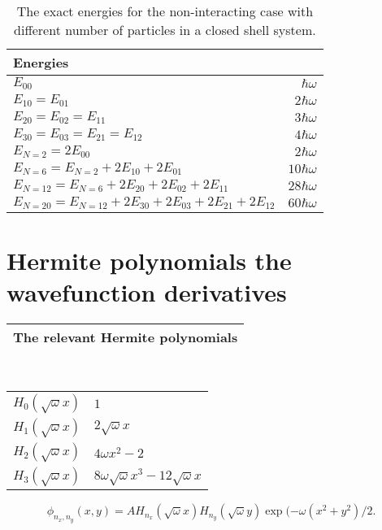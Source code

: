 \begin{table}[H]\caption{The exact energies for the non-interacting case with different number of particles in a closed shell system.}\label{tab:exact_energies_non_interacting}
\center
\begin{tabular}{l|r}
Energies & \\ \hline
$E_{00}$ & $ \hbar \omega$ \\
$E_{10} = E_{01}$ & $2 \hbar \omega$\\
$E_{20} = E_{02} = E_{11}$ & $3 \hbar \omega$\\
$E_{30} = E_{03} = E_{21}= E_{12}$ & $4 \hbar \omega$\\ \hline
$E_{N=2} = 2E_{00}$ & $2 \hbar \omega$\\
$E_{N=6} = E_{N=2} + 2E_{10} + 2E_{01}$ &$ 10 \hbar \omega$\\
$E_{N=12} = E_{N=6} + 2E_{20} +2 E_{02} + 2E_{11}$ &$ 28 \hbar \omega$\\
$E_{N=20} = E_{N=12} + 2E_{30} + 2E_{03} + 2E_{21}+ 2E_{12}$ &$ 60 \hbar \omega$\\
\end{tabular}
\end{table}

\section{Hermite polynomials the wavefunction derivatives}

\begin{table}[H]
\center
\begin{tabular}{l}
The relevant Hermite polynomials \\ \hline
\end{tabular}\\
\begin{tabular}{l|l}
$H_0(\sqrt{\omega}x)$ & $1$ \\
$H_1(\sqrt{\omega}x)$ & $2\sqrt{\omega}x$ \\
$H_2(\sqrt{\omega}x)$ & $4\omega x^2 -2 $ \\
$H_3(\sqrt{\omega}x)$ & $8\omega\sqrt{\omega}x^3 - 12\sqrt{\omega}x $ \\
\end{tabular}
\end{table}

\begin{equation*}
\phi_{n_x,n_y}(x,y) = A H_{n_x}(\sqrt{\omega}x)H_{n_y}(\sqrt{\omega}y)\exp{(-\omega(x^2+y^2)/2}.
\end{equation*}

